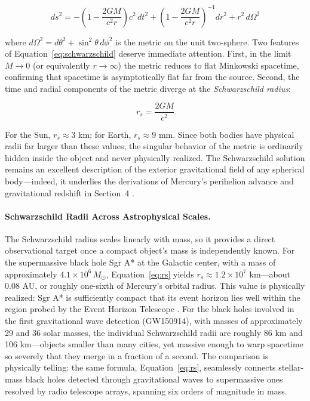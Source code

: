 \documentclass[12pt, a4paper]{article}
\begin{document}
	\begin{equation}
		ds^2 = -\left(1 - \frac{2GM}{c^2 r}\right)c^2\,dt^2
		+ \left(1 - \frac{2GM}{c^2 r}\right)^{-1}dr^2
		+ r^2\,d\Omega^2
		\label{eq:schwarzschild}
	\end{equation}
	
	where \(d\Omega^2 = d\theta^2 + \sin^2\!\theta\, d\phi^2\) is the metric on the unit two-sphere. Two features of Equation~\eqref{eq:schwarzschild} deserve immediate attention. First, in the limit \(M \to 0\) (or equivalently \(r \to \infty\)) the metric reduces to flat Minkowski spacetime, confirming that spacetime is asymptotically flat far from the source. Second, the time and radial components of the metric diverge at the \textit{Schwarzschild radius}:
	
	\begin{equation}
		r_s = \frac{2GM}{c^2}
		\label{eq:rs}
	\end{equation}
	
	For the Sun, \(r_s \approx 3\) km; for Earth, \(r_s \approx 9\) mm. Since both bodies have physical radii far larger than these values, the singular behavior of the metric is ordinarily hidden inside the object and never physically realized. The Schwarzschild solution remains an excellent description of the exterior gravitational field of any spherical body---indeed, it underlies the derivations of Mercury's perihelion advance and gravitational redshift in Section~4 \citep{carrollSpacetimeGeometryIntroduction2019}.
	
	\paragraph{Schwarzschild Radii Across Astrophysical Scales.}
	The Schwarzschild radius scales linearly with mass, so it provides a direct observational target once a compact object's mass is independently known. For the supermassive black hole Sgr A* at the Galactic center, with a mass of approximately $4.1 \times 10^6\,M_\odot$, Equation~\eqref{eq:rs} yields $r_s \approx 1.2 \times 10^7$ km---about 0.08 AU, or roughly one-sixth of Mercury's orbital radius. This value is physically realized: Sgr A* is sufficiently compact that its event horizon lies well within the region probed by the Event Horizon Telescope \citep{AstronomersSnapFirstever2022}. For the black holes involved in the first gravitational wave detection (GW150914), with masses of approximately 29 and 36 solar masses, the individual Schwarzschild radii are roughly 86 km and 106 km---objects smaller than many cities, yet massive enough to warp spacetime so severely that they merge in a fraction of a second. The comparison is physically telling: the same formula, Equation~\eqref{eq:rs}, seamlessly connects stellar-mass black holes detected through gravitational waves to supermassive ones resolved by radio telescope arrays, spanning six orders of magnitude in mass.
	
\end{document}
